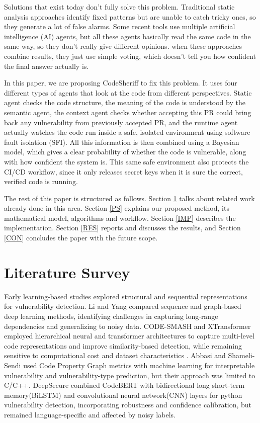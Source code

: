 \documentclass[conference]{IEEEtran}
\begin{document}
Solutions that exist today don’t fully solve this problem. Traditional static analysis approaches identify fixed patterns but are unable to catch tricky ones, so they generate a lot of false alarms. Some recent tools use multiple artificial intelligence (AI) agents, but all these agents basically read the same code in the same way, so they don't really give different opinions. when these approaches combine results, they just use simple voting, which doesn't tell you how confident the final answer actually is.

In this paper, we are proposing CodeSheriff to fix this problem. It uses four different types of agents that look at the code from different perspectives. Static agent checks the code structure, the meaning of the code is understood by the semantic agent, the context agent checks whether accepting this PR could bring back any vulnerability from previously accepted PR, and the runtime agent actually watches the code run inside a safe, isolated environment using software fault isolation (SFI). All this information is then combined using a Bayesian model, which gives a clear probability of whether the code is vulnerable, along with how confident the system is. This same safe environment also protects the CI/CD workflow, since it only releases secret keys when it is sure the correct, verified code is running.


The rest of this paper is structured as follows. Section \ref{LS} talks
about related work already done in this area. Section \ref{PS} explains our
proposed method, its mathematical model, algorithms and workflow.
Section \ref{IMP} describes the implementation. Section \ref{RES} reports
and discusses the results, and Section \ref{CON} concludes the paper with
the future scope.

\section{Literature Survey} \label{LS}

Early learning-based studies explored structural and sequential representations for vulnerability detection. Li and Yang \cite{ref20} compared sequence and graph-based deep learning methods, identifying challenges in capturing long-range dependencies and generalizing to noisy data. CODE-SMASH \cite{ref19} and XTransformer \cite{ref18} employed hierarchical neural and transformer architectures to capture multi-level code representations and improve similarity-based detection, while remaining sensitive to computational cost and dataset characteristics . Abbasi and Shameli-Sendi \cite{ref4} used Code Property Graph metrics with machine learning for interpretable vulnerability and vulnerability-type prediction, but their approach was limited to C/C++. DeepSecure \cite{ref2} combined CodeBERT with bidirectional long short-term memory(BiLSTM) and convolutional neural network(CNN) layers for python vulnerability detection, incorporating robustness and confidence calibration, but remained language-specific and affected by noisy labels.
\end{document}
